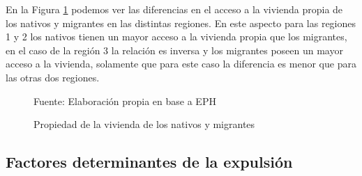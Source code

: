 \documentclass[12pt,a4paper]{article}
\begin{document}
En la Figura \ref{figure:vivienda_mig} podemos ver las diferencias en el acceso a la vivienda propia de los nativos y migrantes  en las distintas regiones. En este aspecto para las regiones 1 y 2 los nativos tienen un mayor acceso a la vivienda propia que los migrantes, en el caso de la región 3 la relación es inversa y los migrantes poseen un mayor acceso a la vivienda, solamente que para este caso la diferencia es menor que para las otras dos regiones.

\begin{figure}[ht!]
\begin{center}
\caption{Propiedad de la vivienda de los nativos y migrantes}
\label{figure:vivienda_mig}
 
\end{center}
\begin{flushleft}
\begin{scriptsize}
Fuente: Elaboración propia en base a EPH
\end{scriptsize}
\end{flushleft}
\end{figure}




\subsection{Factores determinantes de la expulsión}
\end{document}

